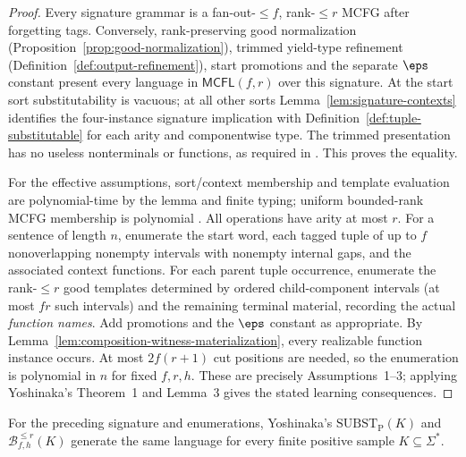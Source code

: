 \begin{proof}
Every signature grammar is a fan-out-$\le f$,
rank-$\le r$ MCFG after forgetting tags.
Conversely, rank-preserving good normalization
(Proposition~\ref{prop:good-normalization}),
trimmed yield-type refinement
(Definition~\ref{def:output-refinement}),
start promotions and the separate $\eps$
constant present every language in
$\mathsf{MCFL}(f,r)$ over this signature.
At the start sort substitutability is
vacuous; at all other sorts
Lemma~\ref{lem:signature-contexts} identifies
the four-instance signature implication
with Definition~\ref{def:tuple-substitutable}
for each arity and componentwise type.
The trimmed presentation has no useless
nonterminals or functions, as required in
\cite[Section~6]{Yoshinaka2015General}.
This proves the equality.

For the effective assumptions, sort/context
membership and template evaluation are
polynomial-time by the lemma and finite
typing; uniform bounded-rank MCFG membership
is polynomial
\cite[Proposition~4]{Yoshinaka2011}.
All operations have arity at most $r$.
For a sentence of length $n$, enumerate
the start word, each tagged tuple of up
to $f$ nonoverlapping nonempty intervals
with nonempty internal gaps, and the
associated context functions. For each
parent tuple occurrence, enumerate the
rank-$\le r$ good templates determined by
ordered child-component intervals (at most
$fr$ such intervals) and the remaining
terminal material, recording the actual
\emph{function names}. Add promotions and
the $\eps$ constant as appropriate.
By Lemma~\ref{lem:composition-witness-materialization},
every realizable function instance occurs.
At most $2f(r+1)$ cut positions are needed,
so the enumeration is polynomial in $n$
for fixed $f,r,h$. These are precisely
Assumptions~1--3; applying Yoshinaka's
Theorem~1 and Lemma~3 gives the stated
learning consequences.
\end{proof}

\begin{lemma}
\label{lem:substp}
For the preceding signature and enumerations,
Yoshinaka's $\mathrm{SUBST}_{\mathrm P}(K)$
and $\mathcal B^{\le r}_{f,h}(K)$ generate
the same language for every finite
positive sample $K\subseteq\Sigma^*$.
\end{lemma}

